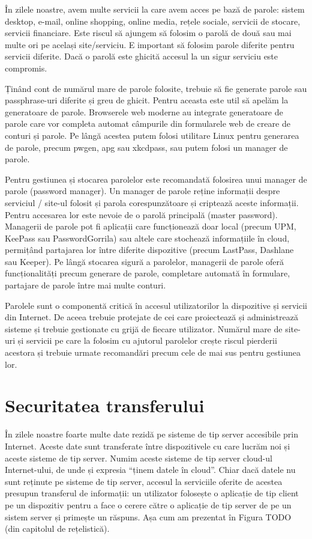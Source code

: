 În zilele noastre, avem multe servicii la care avem acces pe bază de parole: sistem desktop, e-mail, online shopping, online media, rețele sociale, servicii de stocare, servicii financiare. Este riscul să ajungem să folosim o parolă de două sau mai multe ori pe același site/serviciu. E important să folosim parole diferite pentru servicii diferite. Dacă o parolă este ghicită accesul la un sigur serviciu este compromis.

Ținând cont de numărul mare de parole folosite, trebuie să fie generate parole sau passphrase-uri diferite și greu de ghicit. Pentru aceasta este util să apelăm la generatoare de parole. Browserele web moderne au integrate generatoare de parole care vor completa automat câmpurile din formularele web de creare de conturi și parole. Pe lângă acestea putem folosi utilitare Linux pentru generarea de parole, precum pwgen, apg sau xkcdpass, sau putem folosi un manager de parole.

Pentru gestiunea și stocarea parolelor este recomandată folosirea unui manager de parole (password manager). Un manager de parole reține informații despre serviciul / site-ul folosit și parola corespunzătoare și criptează aceste informații. Pentru accesarea lor este nevoie de o parolă principală (master password). Managerii de parole pot fi aplicații care funcționează doar local (precum UPM, KeePass sau PasswordGorrila) sau altele care stochează informațiile în cloud, permițând partajarea lor între diferite dispozitive (precum LastPass, Dashlane sau Keeper). Pe lângă stocarea sigură a parolelor, managerii de parole oferă funcționalități precum generare de parole, completare automată în formulare, partajare de parole între mai multe conturi.

Parolele sunt o componentă critică în accesul utilizatorilor la dispozitive și servicii din Internet. De aceea trebuie protejate de cei care proiectează și administrează sisteme și trebuie gestionate cu grijă de fiecare utilizator. Numărul mare de site-uri și servicii pe care la folosim cu ajutorul parolelor crește riscul pierderii acestora și trebuie urmate recomandări precum cele de mai sus pentru gestiunea lor.

\section{Securitatea transferului}
\label{sec:sec:transfer}

În zilele noastre foarte multe date rezidă pe sisteme de tip server accesibile prin Internet. Aceste date sunt transferate între dispozitivele cu care lucrăm noi și aceste sisteme de tip server. Numim aceste sisteme de tip server cloud-ul Internet-ului, de unde și expresia “ținem datele în cloud”. Chiar dacă datele nu sunt reținute pe sisteme de tip server, accesul la serviciile oferite de acestea presupun transferul de informații: un utilizator folosește o aplicație de tip client pe un dispozitiv pentru a face o cerere către o aplicație de tip server de pe un sistem server și primește un răspuns. Așa cum am prezentat în Figura TODO (din capitolul de rețelistică).

